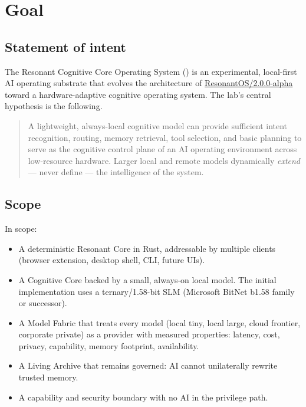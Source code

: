 
\chapter{Goal}

\section{Statement of intent}

The Resonant Cognitive Core Operating System (\RCCOS{}) is an
experimental, local-first AI operating substrate that evolves the
architecture of \href{https://github.com/ResonantOS/2.0.0-alpha}{ResonantOS/2.0.0-alpha}
toward a hardware-adaptive cognitive operating system. The lab's
central hypothesis is the following.

\begin{quote}
A lightweight, always-local cognitive model can provide sufficient
intent recognition, routing, memory retrieval, tool selection, and
basic planning to serve as the cognitive control plane of an AI
operating environment across low-resource hardware. Larger local and
remote models dynamically \emph{extend} --- never define --- the
intelligence of the system.
\end{quote}

\section{Scope}

In scope:
\begin{itemize}
  \item A deterministic Resonant Core in Rust, addressable by multiple
        clients (browser extension, desktop shell, CLI, future UIs).
  \item A Cognitive Core backed by a small, always-on local model.
        The initial implementation uses a ternary/1.58-bit SLM
        (Microsoft BitNet b1.58 family or successor).
  \item A Model Fabric that treats every model (local tiny, local
        large, cloud frontier, corporate private) as a provider with
        measured properties: latency, cost, privacy, capability,
        memory footprint, availability.
  \item A Living Archive that remains governed: AI cannot unilaterally
        rewrite trusted memory.
  \item A capability and security boundary with no AI in the privilege
        path.
\end{itemize}

